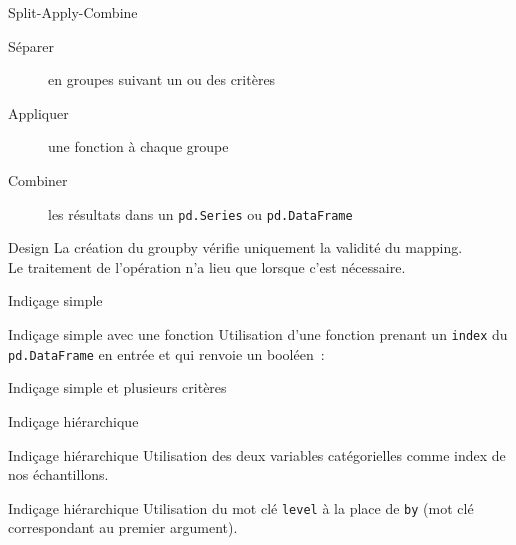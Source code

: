 \begin{frame}{Split-Apply-Combine}
  \begin{description}
    \item[Séparer]   en groupes suivant un ou des critères
    \item[Appliquer] une fonction à chaque groupe
    \item[Combiner]  les résultats dans un \texttt{pd.Series} ou \texttt{pd.DataFrame}
  \end{description}
\end{frame}

\begin{frame}{Design}
  La création du groupby vérifie uniquement la validité du mapping. \\
  Le traitement de l'opération n'a lieu que lorsque c'est nécessaire. \\
\end{frame}

\begin{frame}{Indiçage simple}
\end{frame}

\begin{frame}{Indiçage simple avec une fonction}
  Utilisation d'une fonction prenant un \texttt{index} du \texttt{pd.DataFrame} en entrée et qui renvoie un booléen~:
\end{frame}

\begin{frame}{Indiçage simple et plusieurs critères}
\end{frame}

\begin{frame}{Indiçage hiérarchique}
\end{frame}

\begin{frame}{Indiçage hiérarchique}
  Utilisation des deux variables catégorielles comme index de nos échantillons.

\end{frame}

\begin{frame}{Indiçage hiérarchique}
  Utilisation du mot clé \texttt{level} à la place de \texttt{by} (mot clé correspondant au premier argument).

\end{frame}

